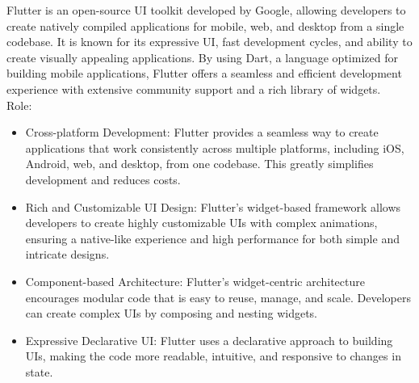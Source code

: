\documentclass[conference]{IEEEtran}
\begin{document}
\noindent Flutter is an open-source UI toolkit developed by Google, allowing developers to create natively compiled applications for mobile, web, and desktop from a single codebase. It is known for its expressive UI, fast development cycles, and ability to create visually appealing applications. By using Dart, a language optimized for building mobile applications, Flutter offers a seamless and efficient development experience with extensive community support and a rich library of widgets.\\

Role:
\begin{itemize}
    \item Cross-platform Development: Flutter provides a seamless way to create applications that work consistently across multiple platforms, including iOS, Android, web, and desktop, from one codebase. This greatly simplifies development and reduces costs.\\
    \item Rich and Customizable UI Design: Flutter's widget-based framework allows developers to create highly customizable UIs with complex animations, ensuring a native-like experience and high performance for both simple and intricate designs.\\
    \item Component-based Architecture: Flutter's widget-centric architecture encourages modular code that is easy to reuse, manage, and scale. Developers can create complex UIs by composing and nesting widgets.\\
    \item Expressive Declarative UI: Flutter uses a declarative approach to building UIs, making the code more readable, intuitive, and responsive to changes in state.\\
\end{itemize}
\end{document}
